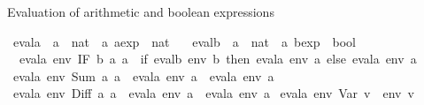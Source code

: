 \begin{isabellebody}
\begin{isamarkuptext}%
\medskip Evaluation of arithmetic and boolean expressions%
\end{isamarkuptext}%
\isamarkuptrue%
\isamarkupfalse%
\ evala\ {}{}\ {}{}{}a\ {}\ nat{}\ {}\ {}a\ aexp\ {}\ nat{}\isanewline
\ \ \ evalb\ {}{}\ {}{}{}a\ {}\ nat{}\ {}\ {}a\ bexp\ {}\ bool{}\isanewline
{}\isanewline
\ \ {}evala\ env\ {}IF\ b\ a{}\ a{}{}\ {}\ {}if\ evalb\ env\ b\ then\ evala\ env\ a{}\ else\ evala\ env\ a{}{}{}\isanewline
{}\ {}evala\ env\ {}Sum\ a{}\ a{}{}\ {}\ evala\ env\ a{}\ {}\ evala\ env\ a{}{}\isanewline
{}\ {}evala\ env\ {}Diff\ a{}\ a{}{}\ {}\ evala\ env\ a{}\ {}\ evala\ env\ a{}{}\isanewline
{}\ {}evala\ env\ {}Var\ v{}\ {}\ env\ v{}\isanewline

\end{isabellebody}
